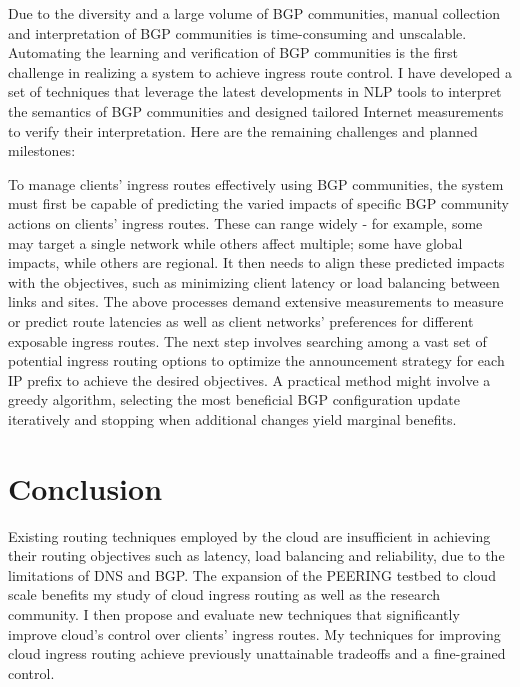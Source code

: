 \documentclass[sigconf,nonacm,screen,letterpaper,9pt]{acmart}
\begin{document}
Due to the diversity and a large volume of BGP communities, manual
collection and interpretation of BGP communities is time-consuming and
unscalable. Automating the learning and verification of BGP communities
is the first challenge in realizing a system to achieve ingress route
control. I have developed a set of techniques that leverage the latest
developments in NLP tools to interpret the semantics of BGP communities
and designed tailored Internet measurements to verify their
interpretation. Here are the remaining challenges and planned
milestones:

To manage clients' ingress routes effectively using BGP communities, the
system must first be capable of predicting the varied impacts of
specific BGP community actions on clients' ingress routes. These can
range widely - for example, some may target a single network while
others affect multiple; some have global impacts, while others are
regional. It then needs to align these predicted impacts with the
objectives, such as minimizing client latency or load balancing between
links and sites. The above processes demand extensive measurements to
measure or predict route latencies as well as client networks'
preferences for different exposable ingress routes. The next step
involves searching among a vast set of potential ingress routing options
to optimize the announcement strategy for each IP prefix to achieve the
desired objectives. A practical method might involve a greedy algorithm,
selecting the most beneficial BGP configuration update iteratively and
stopping when additional changes yield marginal benefits.

\hypertarget{conclusion}{%
\section{Conclusion}\label{conclusion}}

Existing routing techniques employed by the cloud are insufficient in
achieving their routing objectives such as latency, load balancing and
reliability, due to the limitations of DNS and BGP. The expansion of the
PEERING testbed to cloud scale benefits my study of cloud ingress
routing as well as the research community. I then propose and evaluate
new techniques that significantly improve cloud's control over clients'
ingress routes. My techniques for improving cloud ingress routing
achieve previously unattainable tradeoffs and a fine-grained control.

\iffalse

END OF PAPER

\fi
{\small\balance}
\end{document}
